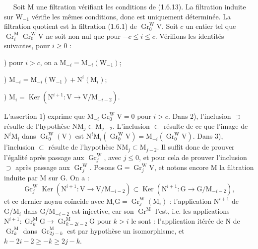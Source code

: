 \documentclass[11pt,leqno]{article}
\newcommand{\Page}[1]{\ifvmode\noindent\else\unskip\ \fi{\footnotesize\textcolor{gray}{[p.\,#1]}}\ \ignorespaces}
\begin{document}
\Page{169}
Soit \(\mathrm{M}\) une filtration vérifiant les conditions de (1.6.13). La filtration induite sur \(\mathrm{W}_{-1}\) vérifie les mêmes conditions, donc est uniquement déterminée. La filtration quotient est la filtration (1.6.1) de \(\operatorname{Gr}_0^{\mathrm{W}}\mathrm{V}\). Soit \(c\) un entier tel que \(\operatorname{Gr}_i^{\mathrm{M}}\operatorname{Gr}_0^{\mathrm{W}}\mathrm{V}\) ne soit non nul que pour \(-c\leq i\leq c\). Vérifions les identités suivantes, pour \(i\geq0\) :

) pour \(i>c\), on a \(\mathrm{M}_{-i}=\mathrm{M}_{-i}(\mathrm{W}_{-1})\);

) \(\mathrm{M}_{-i}=\mathrm{M}_{-i}(\mathrm{W}_{-1})+\mathrm{N}^i(\mathrm{M}_i)\);

) \(\mathrm{M}_i=\operatorname{Ker}(\mathrm{N}^{i+1}:\mathrm{V}\to\mathrm{V}/\mathrm{M}_{-i-2})\).

\noindent L’assertion 1) exprime que \(\mathrm{M}_{-i}\operatorname{Gr}_0^{\mathrm{W}}\mathrm{V}=0\) pour \(i>c\). Dans 2), l’inclusion \(\supset\) résulte de l’hypothèse \(\mathrm{N}\mathrm{M}_j\subset\mathrm{M}_{j-2}\). L’inclusion \(\subset\) résulte de ce que l’image de \(\mathrm{N}^i\mathrm{M}_i\) dans \(\operatorname{Gr}_0^{\mathrm{W}}(\mathrm{V})\) est \(\mathrm{N}^i\mathrm{M}_i(\operatorname{Gr}_0^{\mathrm{W}}\mathrm{V})=\mathrm{M}_{-i}(\operatorname{Gr}_0^{\mathrm{W}}\mathrm{V})\). Dans 3), l’inclusion \(\subset\) résulte de l’hypothèse \(\mathrm{N}\mathrm{M}_j\subset\mathrm{M}_{j-2}\). Il suffit donc de prouver l’égalité après passage aux \(\operatorname{Gr}_j^{\mathrm{W}}\), avec \(j\leq0\), et pour cela de prouver l’inclusion \(\supset\) après passage aux \(\operatorname{Gr}_j^{\mathrm{W}}\). Posons \(\mathrm{G}=\operatorname{Gr}_j^{\mathrm{W}}\mathrm{V}\), et notons encore \(\mathrm{M}\) la filtration induite par \(\mathrm{M}\) sur \(\mathrm{G}\). On a :
\[
\operatorname{Gr}_j^{\mathrm{W}}\operatorname{Ker}
(\mathrm{N}^{i+1}:\mathrm{V}\to\mathrm{V}/\mathrm{M}_{-i-2})
\subset
\operatorname{Ker}
(\mathrm{N}^{i+1}:\mathrm{G}\to\mathrm{G}/\mathrm{M}_{-i-2}),
\]
et ce dernier noyau coïncide avec \(\mathrm{M}_i\mathrm{G}=\operatorname{Gr}_j^{\mathrm{W}}(\mathrm{M}_i)\) : l’application \(\mathrm{N}^{i+1}\) de \(\mathrm{G}/\mathrm{M}_i\) dans \(\mathrm{G}/\mathrm{M}_{-i-2}\) est injective, car son \(\operatorname{Gr}^{\mathrm{M}}\) l’est, i.e. les applications \(\mathrm{N}^{i+1}:\operatorname{Gr}_k^{\mathrm{M}}\mathrm{G}\to\operatorname{Gr}_{k-2i-2}^{\mathrm{M}}\mathrm{G}\) pour \(k>i\) le sont : l’application itérée de \(\mathrm{N}\) de \(\operatorname{Gr}_k^{\mathrm{M}}\) dans \(\operatorname{Gr}_{2j-k}^{\mathrm{M}}\) est par hypothèse un isomorphisme, et \(k-2i-2\geq -k\geq2j-k\).
\end{document}

